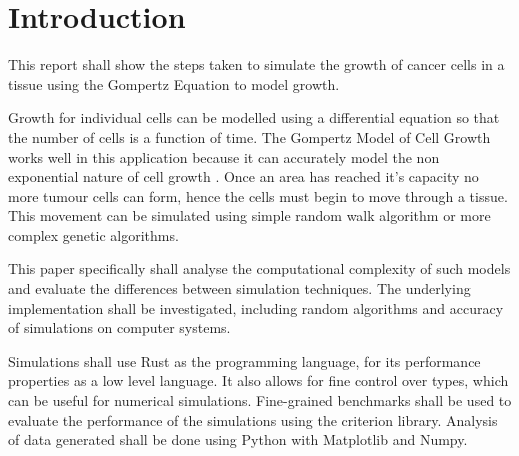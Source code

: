 \chapter{Introduction}

This report shall show the steps taken to simulate the growth of cancer cells in a tissue using the Gompertz Equation to model growth.

Growth for individual cells can be modelled using a differential equation so that the number of cells is a function of time.
The Gompertz Model of Cell Growth works well in this application because it can accurately model the non exponential nature of cell growth \autocite{tatroMathematicsCancerFitting}.
Once an area has reached it's capacity no more tumour cells can form, hence the cells must begin to move through a tissue.
This movement can be simulated using simple random walk algorithm or more complex genetic algorithms.

This paper specifically shall analyse the computational complexity of such models and evaluate the differences between simulation techniques.
The underlying implementation shall be investigated, including random algorithms and accuracy of simulations on computer systems.

Simulations shall use Rust as the programming language, for its performance properties as a low level language.
It also allows for fine control over types, which can be useful for numerical simulations.
Fine-grained benchmarks shall be used to evaluate the performance of the simulations using the criterion library.
Analysis of data generated shall be done using Python with Matplotlib and Numpy.